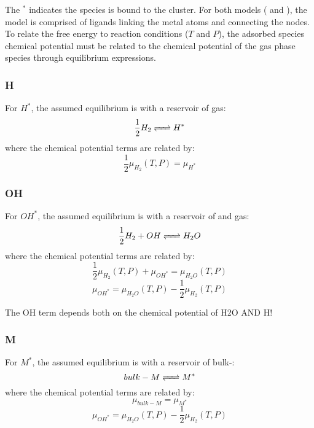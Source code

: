 \documentclass[12pt]{article}
\begin{document}

The $^{*}$ indicates the species is bound to the cluster. For both models ( and ), the model is comprised of  ligands linking the metal atoms and connecting the  nodes. To relate the free energy to reaction conditions ($T$ and $P$), the adsorbed species chemical potential must be related to the chemical potential of the gas phase species through equilibrium expressions. \\ 

\subsubsection{H}
For $H^{*}$, the assumed equilibrium is with a reservoir of  gas:
\begin{equation}
    \frac{1}{2} H_{2} \ce{<=>} H^{*}
\end{equation}
where the chemical potential terms are related by: 
\begin{equation}
    \frac{1}{2} \mu_{H_{2}}(T,P) = \mu_{H^{*}}
\end{equation}

\subsubsection{OH}
For $OH^{*}$, the assumed equilibrium is with a reservoir of  and  gas:
\begin{equation}
    \frac{1}{2} H_{2} + OH \ce{<=>} H_{2}O
\end{equation}
where the chemical potential terms are related by: 
\begin{equation}
    \frac{1}{2} \mu_{H_{2}}(T,P) + \mu_{OH^{*}} = \mu_{H_{2}O}(T,P) 
\end{equation}
\begin{equation}
    \mu_{OH^{*}} = \mu_{H_{2}O}(T,P) - \frac{1}{2} \mu_{H_{2}}(T,P)    
\end{equation}

The OH term depends both on the chemical potential of H2O AND H! 

\subsubsection{M}
For $M^{*}$, the assumed equilibrium is with a reservoir of bulk-:
\begin{equation}
    bulk-M \ce{<=>} M^{*}
\end{equation}
where the chemical potential terms are related by: 
\begin{equation}
    \mu_{bulk-M} = \mu_{M^{*}}
\end{equation}
\begin{equation}
    \mu_{OH^{*}} = \mu_{H_{2}O}(T,P) - \frac{1}{2} \mu_{H_{2}}(T,P)    
\end{equation}

\subsubsection{}
\end{document}
